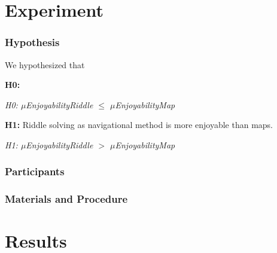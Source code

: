 \section{Experiment}

\subsubsection{Hypothesis}
We hypothesized that 

\textbf{H0:} 

\hspace{10 mm} \textit{H0: $\mu$EnjoyabilityRiddle $\leq$ $\mu$EnjoyabilityMap}

\textbf{H1:} Riddle solving as navigational method is more enjoyable than maps.

\hspace{10 mm} \textit{H1: $\mu$EnjoyabilityRiddle $>$ $\mu$EnjoyabilityMap}

\subsubsection{Participants}


\subsubsection{Materials and Procedure}

 
\section{Results}

